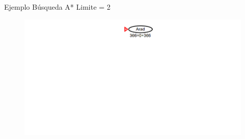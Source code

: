 \begin{frame}{Ejemplo Búsqueda A* }
    Limite = 2
    \begin{figure}\includegraphics[width =123mm]{17img.PNG}\end{figure}
\end{frame}
